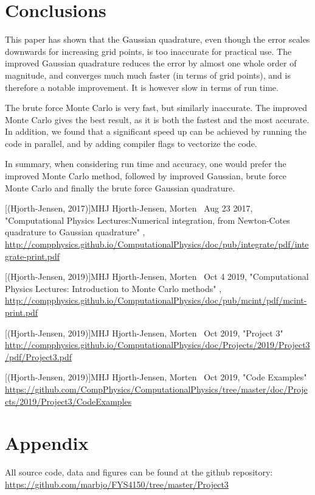 \documentclass{emulateapj}
\begin{document}
\section{Conclusions}
\label{sec:conclusions}
This paper has shown that the Gaussian quadrature, even though the error scales downwards for increasing grid points, is too inaccurate for practical use. The improved Gaussian quadrature reduces the error by almost one whole order of magnitude, and converges much much faster (in terms of grid points), and is therefore a notable improvement. It is however slow in terms of run time.

The brute force Monte Carlo is very fast, but similarly inaccurate. The improved Monte Carlo gives the best result, as it is both the fastest and the most accurate. In addition, we found that a significant speed up can be achieved by running the code in parallel, and by adding compiler flags to vectorize the code.

In summary, when considering run time and accuracy, one would prefer the improved Monte Carlo method, followed by improved Gaussian, brute force Monte Carlo and finally the brute force Gaussian quadrature.


\newpage
\begin{thebibliography}{}

[(Hjorth-Jensen, 2017)]{MHJ} Hjorth-Jensen, Morten \, Aug 23 2017, "Computational Physics Lectures:Numerical integration, from Newton-Cotes quadrature to Gaussian quadrature" , \url{http://compphysics.github.io/ComputationalPhysics/doc/pub/integrate/pdf/integrate-print.pdf}

[(Hjorth-Jensen, 2019)]{MHJ} Hjorth-Jensen, Morten \, Oct 4 2019, "Computational Physics Lectures: Introduction to Monte Carlo methods" , \url{http://compphysics.github.io/ComputationalPhysics/doc/pub/mcint/pdf/mcint-print.pdf}

[(Hjorth-Jensen, 2019)]{MHJ} Hjorth-Jensen, Morten \, Oct 2019, "Project 3"
\url{http://compphysics.github.io/ComputationalPhysics/doc/Projects/2019/Project3/pdf/Project3.pdf}

[(Hjorth-Jensen, 2019)]{MHJ} Hjorth-Jensen, Morten \, Oct 2019, "Code Examples"
\url{https://github.com/CompPhysics/ComputationalPhysics/tree/master/doc/Projects/2019/Project3/CodeExamples}

\end{thebibliography}

\section{Appendix}
All source code, data and figures can be found at the github repository: \url{https://github.com/marbjo/FYS4150/tree/master/Project3}
\end{document}
